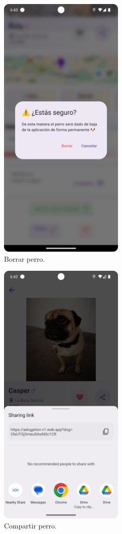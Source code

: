 \documentclass[a4paper, 12pt]{article}
\begin{document}
\begin{figure}[H]
	\begin{center}
		{\includegraphics[width=6cm]{app/DeleteDog.png}\par}
		\caption{Borrar perro.}
	\end{center}  
\end{figure}

\begin{figure}[H]
	\begin{center}
		{\includegraphics[width=6cm]{app/ShareAction.png}\par}
		\caption{Compartir perro.}
	\end{center}  
\end{figure}
\end{document}
